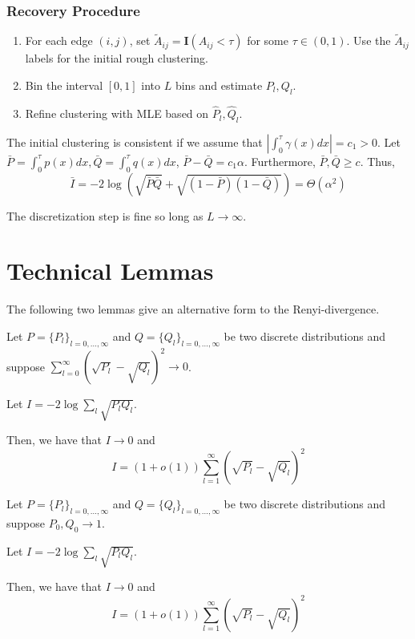\documentclass{article}
\begin{document}
\subsubsection{Recovery Procedure}

\begin{enumerate}
\item For each edge $(i,j)$, set $\tilde{A}_{ij} = \mathbf{I}(A_{ij} < \tau)$ for some $\tau \in (0, 1)$. Use the $\tilde{A}_{ij}$ labels for the initial rough clustering.
\item Bin the interval $[0,1]$ into $L$ bins and estimate $P_l, Q_l$.
\item Refine clustering with MLE based on $\hat{P}_l, \hat{Q}_l$.
\end{enumerate}


The initial clustering is consistent if we assume that $\left| \int_0^{\tau} \gamma(x) dx \right| = c_1 > 0$. Let $\bar{P} = \int_0^{\tau} p(x) dx, \bar{Q} = \int_0^{\tau} q(x) dx$, $\bar{P} - \bar{Q} = c_1 \alpha$. Furthermore, $\bar{P}, \bar{Q} \geq c$. Thus, 
\[
\bar{I} = -2 \log \left( \sqrt{\bar{P} \bar{Q}} + \sqrt{(1-\bar{P})(1-\bar{Q})} \right) = \Theta( \alpha^2)
\]

The discretization step is fine so long as $L \rightarrow \infty$. 




\newpage
\section{Technical Lemmas}

The following two lemmas give an alternative form to the Renyi-divergence. 

\begin{lemma}
\label{lem:simplify_renyi2}
Let $P = \{ P_l \}_{l = 0,..., \infty}$ and $Q = \{ Q_l \}_{l=0,...,\infty}$ be two discrete distributions and suppose $\sum_{l=0}^\infty (\sqrt{P_l} - \sqrt{Q_l} )^2 \rightarrow 0$. 

Let $I = - 2 \log \sum_l \sqrt{ P_l Q_l}$.

Then, we have that $I \rightarrow 0$ and 
\[
I = (1 + o(1)) \sum_{l = 1}^\infty (\sqrt{P_l} - \sqrt{Q_l})^2 
\]
\end{lemma}



\begin{lemma}
\label{lem:simplify_renyi}
Let $P = \{ P_l \}_{l = 0,..., \infty}$ and $Q = \{ Q_l \}_{l=0,...,\infty}$ be two discrete distributions and suppose $P_0, Q_0 \rightarrow 1$. 

Let $I = - 2 \log \sum_l \sqrt{ P_l Q_l}$.

Then, we have that $I \rightarrow 0$ and 
\[
I = (1 + o(1)) \sum_{l = 1}^\infty (\sqrt{P_l} - \sqrt{Q_l})^2 
\]

\end{lemma}
\end{document}
